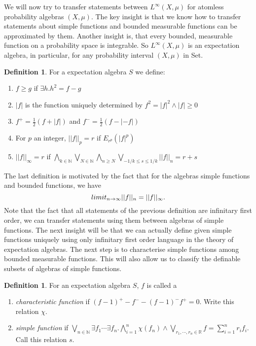 \documentclass[a4paper]{amsproc}
\theoremstyle{plain}
\theoremstyle{definition}
\newtheorem{definition}[theorem]{Definition}
\theoremstyle{remark}
\numberwithin{equation}{section}
\DeclareMathOperator*{\limit}{lim}
\newcommand{\Set}{\textup{\textsf{Set}}}
\begin{document}
We will now try to transfer statements between $L^\infty(X,\mu)$ for atomless probability algebras $(X,\mu)$. The key insight is that we know how to transfer statements about simple functions and bounded measurable functions can be approximated by them. Another insight is, that every bounded, measurable function on a probability space is integrable. So $L^\infty(X,\mu)$ is an expectation algebra, in particular, for any probability interval $(X,\mu)$ in \Set.
\begin{definition} For a expectation algebra $S$ we define:
\begin{enumerate}
\item $f\geq g$ if $\exists h. h^2=f-g$
\item $|f|$ is the function uniquely determined by $f^2=|f|^2\wedge |f|\geq 0$
\item $f^+=\frac{1}{2}(f+|f|)$ and $f^-=\frac{1}{2}(f-|-f|)$
\item For $p$ an integer, $||f||_p=r$ if $E_{r^p}(|f|^p)$
\item $||f||_\infty=r$ if $\bigwedge_{k\in\mathbb{N}}\bigvee_{N\in\mathbb{N}}\bigwedge_{n\geq N}\bigvee_{-1/k\leq s\leq 1/k}||f||_{n}=r+s$

\end{enumerate}
\end{definition}
The last definition is motivated by the fact that for the algebras simple functions and bounded functions, we have
\[  \\limit_{n\rightarrow \infty} ||f||_n=||f||_\infty. \]
Note that the fact that all statements of the previous definition are infinitary first order, we can transfer statements using them between algebras of simple functions. The next insight will be that we can actually define given simple functions uniquely using only infinitary first order language in the theory of expectation algebras.\newline
\indent The next step is to characterise simple functions among bounded measurable functions. This will also allow us to classify the definable subsets of algebras of simple functions.
\begin{definition} For an expectation algebra $S$, $f$ is called a
\begin{enumerate}\item \emph{characteristic function} if $(f-1)^+-f^- -(f-1)^-f^+=0$. Write this relation $\chi$.
\item \emph{simple function} if $\bigvee_{n\in \mathbb{N}}\exists f_1 \cdots \exists f_n. \bigwedge_{i=1}^n \chi(f_n)\wedge \bigvee_{r_1,\cdots,r_n\in\mathbb{R}} f=\sum_{i=1}^n r_if_i$. Call this relation $s$.
\end{enumerate}
\end{definition}
\end{document}
